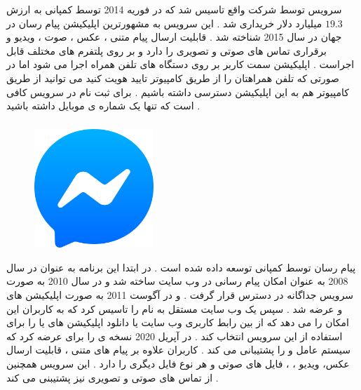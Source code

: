\documentclass[12pt]{book}
\begin{document}
سرویس
توسط شرکت
واقع
تاسیس شد که در فوریه 2014 توسط کمپانی 
به ارزش
$19.3$
میلیارد دلار خریداری شد .
این سرویس به مشهورترین اپلیکیشن پیام رسان در جهان در سال 2015 شناخته شد .
قابلیت ارسال پیام متنی ، عکس ، صوت ، ویدیو و برقراری تماس های صوتی و تصویری را دارد و بر روی پلتفرم های مختلف قابل اجراست .
اپلیکیشن سمت کاربر
بر روی دستگاه های تلفن همراه اجرا می شود اما در صورتی که تلفن همراهتان را از طریق کامپیوتر تایید هویت کنید می توانید از طریق کامپیوتر هم به این اپلیکیشن دسترسی داشته باشیم .
برای ثبت نام در سرویس
کافی است که تنها یک شماره ی موبایل داشته باشید .



\subsubsection{}

\begin{figure}
  \vspace{-20pt}
  \begin{center}
    \includegraphics[width=0.4\textwidth]{./600px-Facebook_Messenger_4_Logo.svg.png}
  \end{center}
  \vspace{-20pt}
  \caption{}
  \vspace{-10pt}
\end{figure}


پیام رسان
توسط کمپانی 
توسعه داده شده است .
در ابتدا این برنامه به عنوان
در سال 2008 به عنوان امکان پیام رسانی در وب سایت 
ساخته شد و در سال 2010 به صورت سرویس جداگانه در دسترس قرار گرفت .
و در آگوست 2011 به صورت اپلیکیشن های 
و 
عرضه شد .
سپس
یک وب سایت مستقل به نام
را تاسیس کرد که به کاربران این امکان را می دهد که از بین رابط کاربری وب سایت یا دانلود اپلیکیشن های 
یا
را برای استفاده از این سرویس انتخاب کند .
در آپریل 2020 
نسخه ی 
را برای
عرضه کرد که سیستم عامل
و 
را پشتیبانی می کند .
کاربران
علاوه بر پیام های متنی ، قابلیت ارسال عکس، ویدیو ، 
،
فایل های صوتی و هر نوع فایل دیگری را دارد .
این سرویس همچنین از تماس های صوتی و تصویری نیز پشتیبنی می کند .
\end{document}
